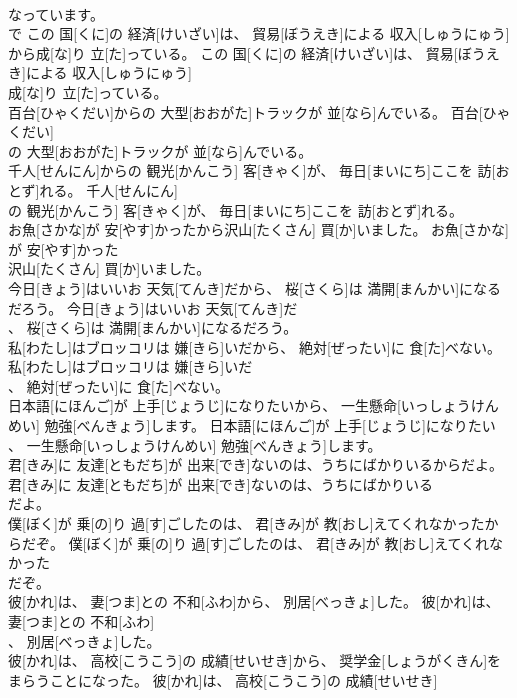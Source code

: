 \documentclass[8pt]{extreport}
\begin{document}
\begin{CJK}{UTF8}{min}
\\	なっています。	
\\	で	この 国[くに]の 経済[けいざい]は、 貿易[ぼうえき]による 収入[しゅうにゅう]から成[な]り 立[た]っている。	この 国[くに]の 経済[けいざい]は、 貿易[ぼうえき]による 収入[しゅうにゅう]
\\	成[な]り 立[た]っている。	
\\	百台[ひゃくだい]からの 大型[おおがた]トラックが 並[なら]んでいる。	百台[ひゃくだい]
\\	の 大型[おおがた]トラックが 並[なら]んでいる。	
\\	千人[せんにん]からの 観光[かんこう] 客[きゃく]が、 毎日[まいにち]ここを 訪[おとず]れる。	千人[せんにん]
\\	の 観光[かんこう] 客[きゃく]が、 毎日[まいにち]ここを 訪[おとず]れる。	
\\	お魚[さかな]が 安[やす]かったから沢山[たくさん] 買[か]いました。	お魚[さかな]が 安[やす]かった
\\	沢山[たくさん] 買[か]いました。	
\\	今日[きょう]はいいお 天気[てんき]だから、 桜[さくら]は 満開[まんかい]になるだろう。	今日[きょう]はいいお 天気[てんき]だ
\\	、 桜[さくら]は 満開[まんかい]になるだろう。	
\\	私[わたし]はブロッコリは 嫌[きら]いだから、 絶対[ぜったい]に 食[た]べない。	私[わたし]はブロッコリは 嫌[きら]いだ
\\	、 絶対[ぜったい]に 食[た]べない。	
\\	日本語[にほんご]が 上手[じょうじ]になりたいから、 一生懸命[いっしょうけんめい] 勉強[べんきょう]します。	日本語[にほんご]が 上手[じょうじ]になりたい
\\	、 一生懸命[いっしょうけんめい] 勉強[べんきょう]します。	
\\	君[きみ]に 友達[ともだち]が 出来[でき]ないのは、うちにばかりいるからだよ。	君[きみ]に 友達[ともだち]が 出来[でき]ないのは、うちにばかりいる
\\	だよ。	
\\	僕[ぼく]が 乗[の]り 過[す]ごしたのは、 君[きみ]が 教[おし]えてくれなかったからだぞ。	僕[ぼく]が 乗[の]り 過[す]ごしたのは、 君[きみ]が 教[おし]えてくれなかった
\\	だぞ。	
\\	彼[かれ]は、 妻[つま]との 不和[ふわ]から、 別居[べっきょ]した。	彼[かれ]は、 妻[つま]との 不和[ふわ]
\\	、 別居[べっきょ]した。	
\\	彼[かれ]は、 高校[こうこう]の 成績[せいせき]から、 奨学金[しょうがくきん]をまらうことになった。	彼[かれ]は、 高校[こうこう]の 成績[せいせき]

\end{CJK}
\end{document}
